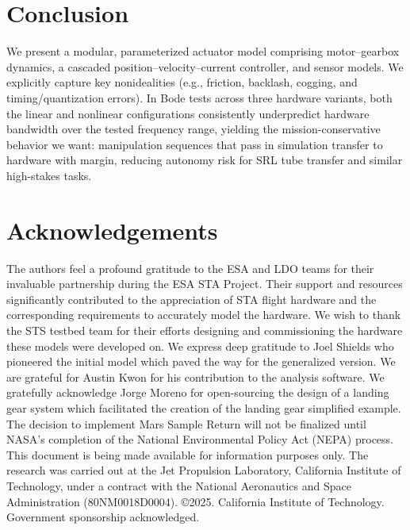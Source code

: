 \documentclass[twocolumn,letterpaper]{IEEEAerospaceCLS}  %
\begin{document}
\newpage
\section{Conclusion}
We present a modular, parameterized actuator model comprising motor–gearbox dynamics, a cascaded position–velocity–current controller, and sensor models. We explicitly capture key nonidealities (e.g., friction, backlash, cogging, and timing/quantization errors). In Bode tests across three hardware variants, both the linear and nonlinear configurations consistently underpredict hardware bandwidth over the tested frequency range, yielding the mission-conservative behavior we want: manipulation sequences that pass in simulation transfer to hardware with margin, reducing autonomy risk for SRL tube transfer and similar high-stakes tasks.


\section*{Acknowledgements}
The authors feel a profound gratitude to the ESA and LDO teams for their invaluable partnership during the ESA STA Project. Their support and resources significantly contributed to the appreciation of STA flight hardware and the corresponding requirements to accurately model the hardware.
We wish to thank the STS testbed team for their efforts designing and commissioning the hardware these models were developed on.
We express deep gratitude to Joel Shields who pioneered the initial model which paved the way for the generalized version.
We are grateful for Austin Kwon for his contribution to the analysis software.
We gratefully acknowledge Jorge Moreno for open-sourcing the design of a landing gear system which facilitated the creation of the landing gear simplified example.
The decision to implement Mars Sample Return will not be finalized until NASA’s completion of the National Environmental Policy Act (NEPA) process. This document is being made available for information purposes only.
The research was carried out at the Jet Propulsion Laboratory, California Institute of Technology, under a contract with the 
National Aeronautics and Space Administration (80NM0018D0004). \copyright 2025. California Institute of Technology. Government sponsorship acknowledged.

\vspace{3cm}
\newpage
\end{document}
